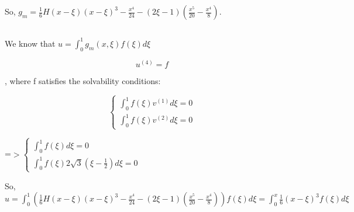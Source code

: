 \documentclass{article}
\begin{document}
{\raggedright
So,
$g_m=\frac{1}{6}{H\left(x-\xi{}\right)\left(x-\xi{}\right)}^3-\frac{x^4}{24}-\left(2\xi{}-1\right)\left(\frac{x^5}{20}-\frac{x^4}{8}\right)$.
}
\subsection{}

{\raggedright
We know that $u=\int_0^1g_m\left(x,\xi{}\right)f\left(\xi{}\right)d\xi{}$
}

{\raggedright


\[
u^{(4)}=f
\]

, where f satisfies the solvability conditions:
}

{\raggedright


\[
\left\{\begin{array}{l}\int_0^1f\left(\xi{}\right)v^{(1)}d\xi{}=0 \\
\int_0^1f\left(\xi{}\right)v^{(2)}d\xi{}=0\end{array}\right.
\]

=$>$$\left\{\begin{array}{l}\int_0^1f\left(\xi{}\right)d\xi{}=0 \\
\int_0^1f\left(\xi{}\right)2\sqrt{3}(\xi{}-\frac{1}{2})d\xi{}=0\end{array}\right.$
}

{\raggedright
So,
$u=\int_0^1(\frac{1}{6}{H\left(x-\xi{}\right)\left(x-\xi{}\right)}^3-\frac{x^4}{24}-\left(2\xi{}-1\right)\left(\frac{x^5}{20}-\frac{x^4}{8}\right))f\left(\xi{}\right)d\xi{}=\int_0^x\frac{1}{6}{\left(x-\xi{}\right)}^3f\left(\xi{}\right)d\xi{}$
}
\end{document}
